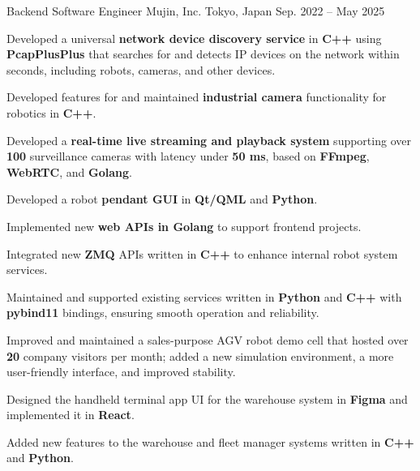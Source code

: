 \begin{cventries}
  \cventry
      {Backend Software Engineer} %
    {Mujin, Inc.} %
      {Tokyo, Japan} %
    {Sep. 2022 -- May 2025} %
      {
        \begin{cvitems} %
      \item {Developed a universal \textbf{network device discovery service} in \textbf{C++} using \textbf{PcapPlusPlus} that searches for and detects IP devices on the network within seconds, including robots, cameras, and other devices.}
      \item {Developed features for and maintained \textbf{industrial camera} functionality for robotics in \textbf{C++}.}
      \item {Developed a \textbf{real-time live streaming and playback system} supporting over \textbf{100} surveillance cameras with latency under \textbf{50 ms}, based on \textbf{FFmpeg}, \textbf{WebRTC}, and \textbf{Golang}.}
      \item {Developed a robot \textbf{pendant GUI} in \textbf{Qt/QML} and \textbf{Python}.}
          \item {Implemented new \textbf{web APIs in Golang} to support frontend projects.}
      \item {Integrated new \textbf{ZMQ} APIs written in \textbf{C++} to enhance internal robot system services.}
      \item {Maintained and supported existing services written in \textbf{Python} and \textbf{C++} with \textbf{pybind11} bindings, ensuring smooth operation and reliability.}
      \item {Improved and maintained a sales-purpose AGV robot demo cell that hosted over \textbf{20} company visitors per month; added a new simulation environment, a more user-friendly interface, and improved stability.}
      \item {Designed the handheld terminal app UI for the warehouse system in \textbf{Figma} and implemented it in \textbf{React}.}
      \item {Added new features to the warehouse and fleet manager systems written in \textbf{C++} and \textbf{Python}.}
        \end{cvitems}
    }

    \vspace{2mm}


\end{cventries}

